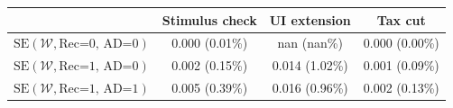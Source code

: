 \begin{tabular}{@{}lccc@{}}
\toprule
                          & Stimulus check      & UI extension    & Tax cut    \\  \midrule
$\mathrm{SE}(\mathcal{W}, \text{Rec=0, AD=0})$ & 0.000 (0.01\%)  & nan (nan\%)  & 0.000 (0.00\%)     \\
$\mathrm{SE}(\mathcal{W}, \text{Rec=1, AD=0})$ & 0.002 (0.15\%)  & 0.014 (1.02\%)  & 0.001 (0.09\%)     \\
$\mathrm{SE}(\mathcal{W}, \text{Rec=1, AD=1})$ & 0.005 (0.39\%)  & 0.016 (0.96\%)  & 0.002 (0.13\%)     \\ \bottomrule
\end{tabular}
